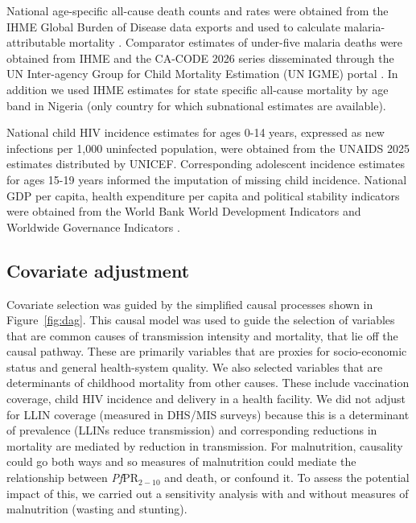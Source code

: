 \documentclass[12pt]{article}
\begin{document}
National age-specific all-cause death counts and rates were obtained from the IHME Global Burden of Disease data exports and used to calculate malaria-attributable mortality \cite{ihme}.
Comparator estimates of under-five malaria deaths were obtained from IHME and the CA-CODE 2026 series disseminated through the UN Inter-agency Group for Child Mortality Estimation (UN IGME) portal \cite{Perin:26,Villavicencio:24}. In addition we used IHME estimates for state specific all-cause mortality by age band in Nigeria (only country for which subnational estimates are available).

National child HIV incidence estimates for ages 0-14 years, expressed as new infections per 1,000 uninfected population, were obtained from the UNAIDS 2025 estimates distributed by UNICEF.
Corresponding adolescent incidence estimates for ages 15-19 years informed the imputation of missing child incidence. National GDP per capita, health expenditure per capita and political stability indicators were obtained from the World Bank World Development Indicators and Worldwide Governance Indicators \cite{wdi,wgi}.


\subsection*{Covariate adjustment}

Covariate selection was guided by the simplified causal processes shown in Figure~\ref{fig:dag}. This causal model was used to guide the selection of variables that are common causes of transmission intensity and mortality, that lie off the causal pathway. These are primarily variables that are proxies for socio-economic status and general health-system quality. We also selected variables that are determinants of childhood mortality from other causes. These include vaccination coverage, child HIV incidence and delivery in a health facility. We did not adjust for LLIN coverage (measured in DHS/MIS surveys) because this is a determinant of prevalence (LLINs reduce transmission) and corresponding reductions in mortality are mediated by reduction in transmission. For malnutrition, causality could go both ways and so measures of malnutrition could mediate the relationship between \textit{Pf}PR$_{2-10}$ and death, or confound it. To assess the potential impact of this, we carried out a sensitivity analysis with and without measures of malnutrition (wasting and stunting). 
\end{document}
